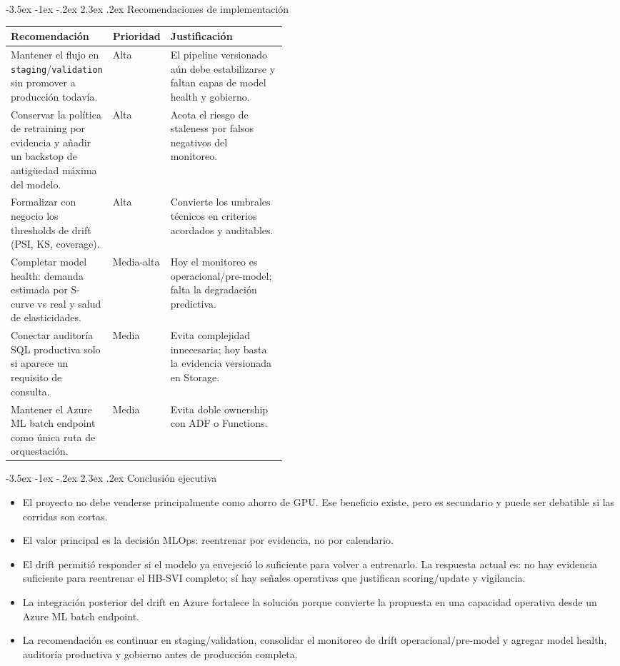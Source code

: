 \documentclass[11pt,letterpaper]{article}
\makeatletter
\renewcommand\section{\@startsection{section}{1}{\z@}
  {-3.5ex \@plus -1ex \@minus -.2ex}
  {2.3ex \@plus .2ex}
  {\Large\bfseries\sffamily\color{azulTec}}}
\makeatother
\begin{document}
\section{Recomendaciones de implementación}

\begin{tabularx}{\linewidth}{L{0.32\linewidth}L{0.13\linewidth}Y}
\toprule
\textbf{Recomendación} & \textbf{Prioridad} & \textbf{Justificación} \\
\midrule
Mantener el flujo en \texttt{staging}/\texttt{validation} sin promover a producción todavía. & Alta & El pipeline versionado aún debe estabilizarse y faltan capas de model health y gobierno. \\
Conservar la política de retraining por evidencia y añadir un backstop de antigüedad máxima del modelo. & Alta & Acota el riesgo de staleness por falsos negativos del monitoreo. \\
Formalizar con negocio los thresholds de drift (PSI, KS, coverage). & Alta & Convierte los umbrales técnicos en criterios acordados y auditables. \\
Completar model health: demanda estimada por S-curve vs real y salud de elasticidades. & Media-alta & Hoy el monitoreo es operacional/pre-model; falta la degradación predictiva. \\
Conectar auditoría SQL productiva solo si aparece un requisito de consulta. & Media & Evita complejidad innecesaria; hoy basta la evidencia versionada en Storage. \\
Mantener el Azure ML batch endpoint como única ruta de orquestación. & Media & Evita doble ownership con ADF o Functions. \\
\bottomrule
\end{tabularx}

\section{Conclusión ejecutiva}

\begin{itemize}
  \item El proyecto no debe venderse principalmente como ahorro de GPU. Ese beneficio existe, pero es secundario y puede ser debatible si las corridas son cortas.
  \item El valor principal es la decisión MLOps: reentrenar por evidencia, no por calendario.
  \item El drift permitió responder si el modelo ya envejeció lo suficiente para volver a entrenarlo. La respuesta actual es: no hay evidencia suficiente para reentrenar el HB-SVI completo; sí hay señales operativas que justifican scoring/update y vigilancia.
  \item La integración posterior del drift en Azure fortalece la solución porque convierte la propuesta en una capacidad operativa desde un Azure ML batch endpoint.
  \item La recomendación es continuar en staging/validation, consolidar el monitoreo de drift operacional/pre-model y agregar model health, auditoría productiva y gobierno antes de producción completa.
\end{itemize}
\end{document}
